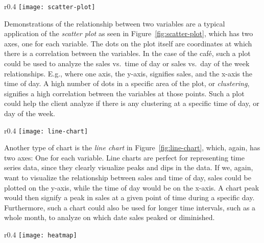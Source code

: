 \pagebreak

\begin{wrapfigure}{r}{0.4\textwidth}
    \centering
    \texttt{[image: scatter-plot]}
    \caption{A typical scatter plot~\cite{atlassianChartTypes}.}\label{fig:scatter-plot}
\end{wrapfigure}

Demonstrations of the relationship between two variables are a typical application of the \textit{scatter plot}
as seen in Figure~\ref{fig:scatter-plot}, which has two axes, one for each variable.
The dots on the plot itself are coordinates at which there is a correlation between the variables.
In the case of the café, such a plot could be used to analyze the sales vs.\ time of day or sales vs.\ day of the week
relationships.
E.g., where one axis, the y-axis, signifies sales, and the x-axis the time of day.
A high number of dots in a specific area of the plot, or \textit{clustering}, signifies a high correlation between the
variables at those points.
Such a plot could help the client analyze if there is any clustering at a specific time of day, or day of the week.

\begin{wrapfigure}{r}{0.4\textwidth}
    \centering
    \texttt{[image: line-chart]}
    \caption{A line chart~\cite{atlassianChartTypes}.}\label{fig:line-chart}
\end{wrapfigure}

Another type of chart is the \textit{line chart} in Figure~\ref{fig:line-chart}, which, again, has two axes: One for
each variable.
Line charts are perfect for representing time series data, since they clearly visualize peaks and dips in the data.
If we, again, want to visualize the relationship between sales and time of day, sales could be plotted on the y-axis,
while the time of day would be on the x-axis.
A chart peak would then signify a peak in sales at a given point of time during a specific day.
Furthermore, such a chart could also be used for longer time intervals, such as a whole month, to analyze on which date
sales peaked or diminished.

\begin{wrapfigure}{r}{0.4\textwidth}
    \centering
    \texttt{[image: heatmap]}
    \caption{A heatmap~\cite{atlassianHeatmaps}.}\label{fig:heatmap}
\end{wrapfigure}

